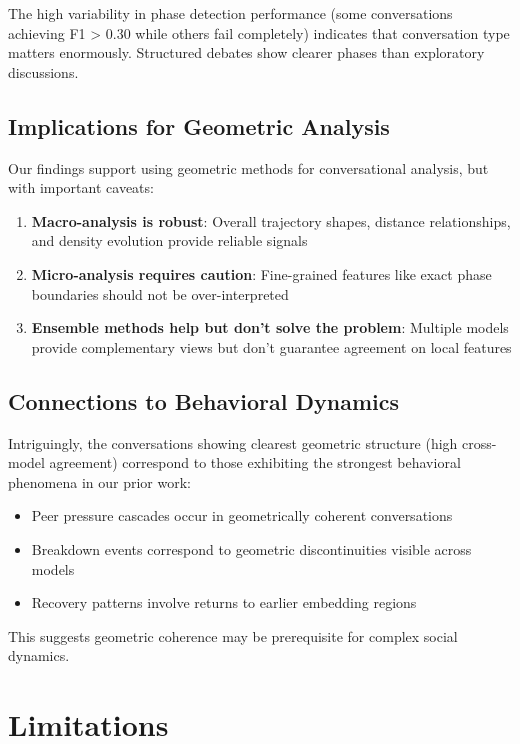 \documentclass[11pt,letterpaper]{article}
\begin{document}
The high variability in phase detection performance (some conversations achieving F1 > 0.30 while others fail completely) indicates that conversation type matters enormously. Structured debates show clearer phases than exploratory discussions.

\subsection{Implications for Geometric Analysis}

Our findings support using geometric methods for conversational analysis, but with important caveats:

\begin{enumerate}
\item \textbf{Macro-analysis is robust}: Overall trajectory shapes, distance relationships, and density evolution provide reliable signals
\item \textbf{Micro-analysis requires caution}: Fine-grained features like exact phase boundaries should not be over-interpreted
\item \textbf{Ensemble methods help but don't solve the problem}: Multiple models provide complementary views but don't guarantee agreement on local features
\end{enumerate}

\subsection{Connections to Behavioral Dynamics}

Intriguingly, the conversations showing clearest geometric structure (high cross-model agreement) correspond to those exhibiting the strongest behavioral phenomena in our prior work:
\begin{itemize}
\item Peer pressure cascades occur in geometrically coherent conversations
\item Breakdown events correspond to geometric discontinuities visible across models
\item Recovery patterns involve returns to earlier embedding regions
\end{itemize}

This suggests geometric coherence may be prerequisite for complex social dynamics.

\section{Limitations}
\end{document}

